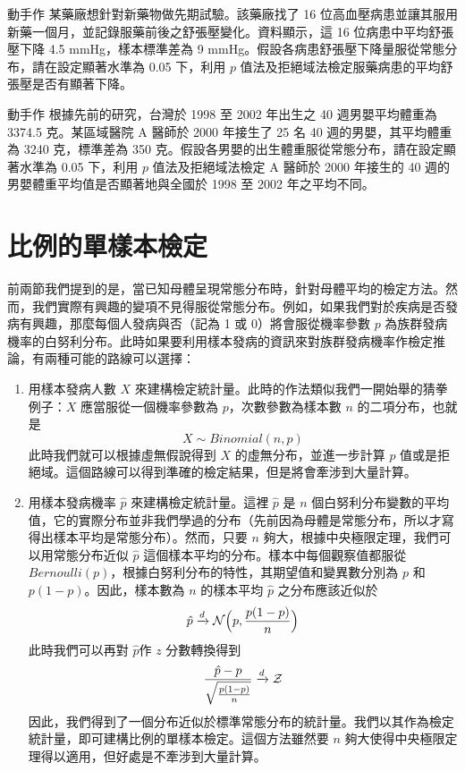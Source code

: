     \vspace{-0.75cm}

    \begin{custom}{動手作}
        某藥廠想針對新藥物做先期試驗。該藥廠找了 16 位高血壓病患並讓其服用新藥一個月，並記錄服藥前後之舒張壓變化。資料顯示，這 16 位病患中平均舒張壓下降 4.5 mmHg，樣本標準差為 9 mmHg。假設各病患舒張壓下降量服從常態分布，請在設定顯著水準為 0.05 下，利用 $p$ 值法及拒絕域法檢定服藥病患的平均舒張壓是否有顯著下降。
    \end{custom}
    
    \answerbox{150pt}

    \bigskip

    \begin{custom}{動手作}
        根據先前的研究，台灣於 1998 至 2002 年出生之 40 週男嬰平均體重為 3374.5 克。某區域醫院 A 醫師於 2000 年接生了 25 名 40 週的男嬰，其平均體重為 3240 克，標準差為 350 克。假設各男嬰的出生體重服從常態分布，請在設定顯著水準為 0.05 下，利用 $p$ 值法及拒絕域法檢定 A 醫師於 2000 年接生的 40 週的男嬰體重平均值是否顯著地與全國於 1998 至 2002 年之平均不同。
    \end{custom}

    \answerbox{150pt}

\section{比例的單樣本檢定}
    前兩節我們提到的是，當已知母體呈現常態分布時，針對母體平均的檢定方法。然而，我們實際有興趣的變項不見得服從常態分布。例如，如果我們對於疾病是否發病有興趣，那麼每個人發病與否（記為 1 或 0）將會服從機率參數 $p$ 為族群發病機率的白努利分布。此時如果要利用樣本發病的資訊來對族群發病機率作檢定推論，有兩種可能的路線可以選擇：
    \begin{enumerate}
        \item 用樣本發病人數 $X$ 來建構檢定統計量。此時的作法類似我們一開始舉的猜拳例子：$X$ 應當服從一個機率參數為 $p$，次數參數為樣本數 $n$ 的二項分布，也就是
        \smallskip
        \[X \sim Binomial(n,p)\]
        \smallskip
        此時我們就可以根據虛無假說得到 $X$ 的虛無分布，並進一步計算 $p$ 值或是拒絕域。這個路線可以得到準確的檢定結果，但是將會牽涉到大量計算。
        \item 用樣本發病機率 $\hat{p}$ 來建構檢定統計量。這裡 $\hat{p}$ 是 $n$ 個白努利分布變數的平均值，它的實際分布並非我們學過的分布（先前因為母體是常態分布，所以才寫得出樣本平均是常態分布）。然而，只要 $n$ 夠大，根據中央極限定理，我們可以用常態分布近似 $\hat{p}$ 這個樣本平均的分布。樣本中每個觀察值都服從 $Bernoulli(p)$，根據白努利分布的特性，其期望值和變異數分別為 $p$ 和 $p(1-p)$。因此，樣本數為 $n$ 的樣本平均 $\hat{p}$ 之分布應該近似於
        \smallskip
        \[\hat{p} \xrightarrow[]{d} \mathcal{N}\Big(p, \frac{p(1-p)}{n}\Big)\]
        \smallskip
        此時我們可以再對 $\hat{p}$作 $z$ 分數轉換得到
        \smallskip
        \[\frac{\hat{p}-p}{\sqrt{\frac{p(1-p)}{n}}} \xrightarrow[]{d} \mathcal{Z}\]
        \smallskip
        因此，我們得到了一個分布近似於標準常態分布的統計量。我們以其作為檢定統計量，即可建構比例的單樣本檢定。這個方法雖然要 $n$ 夠大使得中央極限定理得以適用，但好處是不牽涉到大量計算。
    \end{enumerate}

